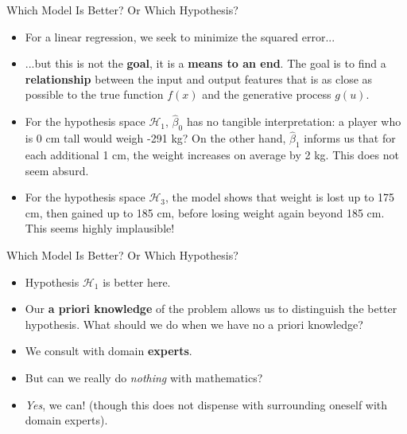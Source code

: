\begin{frame}{Which Model Is Better? Or Which Hypothesis?}
	\begin{itemize}
		\item For a linear regression, we seek to minimize the squared error...
		\pause
		\item ...but this is not the \textbf{goal}, it is a \textbf{means to an end}. The goal is to find a \textbf{relationship} between the input and output features that is as close as possible to the true function $f(x)$ and the generative process $g(u)$.
		\pause
		\item For the hypothesis space $\mathcal{H}_1$, $\hat{\beta}_0$ has no tangible interpretation: a player who is 0 cm tall would weigh -291 kg? On the other hand, $\hat{\beta}_1$ informs us that for each additional 1 cm, the weight increases on average by 2 kg. This does not seem absurd.
		\pause
		\item For the hypothesis space $\mathcal{H}_3$, the model shows that weight is lost up to 175 cm, then gained up to 185 cm, before losing weight again beyond 185 cm. This seems highly implausible!
	\end{itemize}
\end{frame}

\begin{frame}{Which Model Is Better? Or Which Hypothesis?}
	\begin{itemize}
		\item Hypothesis $\mathcal{H}_1$ is better here.
		\pause
		\item Our \textbf{a priori knowledge} of the problem allows us to distinguish the better hypothesis. What should we do when we have no a priori knowledge?
		\pause
		\item We consult with domain \textbf{experts}.
		\pause
		\item But can we really do \textit{nothing} with mathematics?
		\pause
		\item \textit{Yes}, we can! (though this does not dispense with surrounding oneself with domain experts).
	\end{itemize}
\end{frame}

